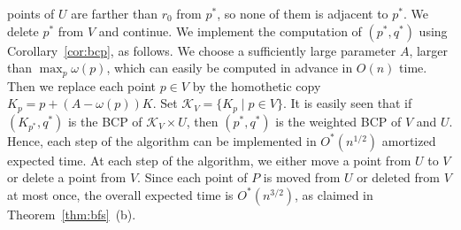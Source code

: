 \documentclass[11pt]{article}
\def\K{\mathcal{K}}
\def\marrow{\marginpar[\hfill$\longrightarrow$]{$\longleftarrow$}}
\def\micha#1{{\color{magenta} \textsc{(Micha says: }\marrow\textsf{#1})}}
\theoremstyle{definition}
\begin{document}
points of $U$ are farther than $r_0$ from $p^*$, so none of them is adjacent to $p^*$.
We delete $p^*$ from $V$ and continue.
%
We implement the computation of $(p^*,q^*)$  using Corollary~\ref{cor:bcp}, as follows.
We choose a sufficiently large parameter $A$, larger than $\max_p \omega(p)$, which can easily be 
computed in advance in $O(n)$ time. Then we replace each point $p\in V$ by the homothetic copy 
$K_p = p + (A-\omega(p))K$. Set $\K_V = \{ K_p \mid p \in V\}$. It is easily seen that if 
$(K_{p^*}, q^*)$ is the BCP of $\K_V \times U$, then $(p^*,q^*)$ is the weighted BCP of 
$V$ and $U$. Hence, each step of the
algorithm can be implemented in $O^*(n^{1/2})$ amortized expected time. 
%
At each step of the algorithm, we either move a point from $U$ to $V$ or delete a point from $V$.
Since each point of $P$ is moved from $U$ or deleted from $V$ at most once, the overall 
expected time is $O^*(n^{3/2})$, as claimed in Theorem~\ref{thm:bfs}~(b).
\fi
%
%
\end{document}
